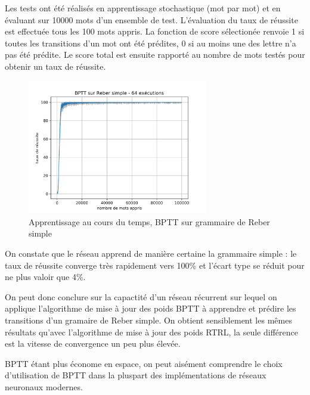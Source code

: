 \medskip

Les tests ont été réalisés en apprentissage stochastique (mot par mot) et en
évaluant sur 10000 mots d'un ensemble de test. L'évaluation du taux de réussite
est effectuée tous les 100 mots appris. La fonction de score sélectionée renvoie
1 si toutes les transitions d'un mot ont été prédites, 0 si au moins une des
lettre n'a pas été prédite. Le score total est ensuite rapporté au nombre de
mots testés pour obtenir un taux de réussite.


\begin{figure}[!ht]
\begin{center}
\includegraphics[width=0.7\textwidth]{images/results/bptt_simplereber_ls30_lr01.png}
\caption{Apprentissage au cours du temps, BPTT sur grammaire de Reber simple}
\end{center}
\end{figure}

\medskip

On constate que le réseau apprend de manière certaine la grammaire simple : 
le taux de réussite converge très rapidement vers 100\% et l'écart type
se réduit pour ne plus valoir que 4\%.

\medskip

On peut donc conclure sur la capactité d'un réseau récurrent sur lequel on
applique l'algorithme de mise à jour des poids BPTT à apprendre et prédire les
transitions d'un gramaire de Reber simple. On obtient sensiblement les mêmes
résultats qu'avec l'algorithme de mise à jour des poids RTRL, la seule
différence est la vitesse de convergence un peu plus élevée.

\medskip

BPTT étant plus économe en espace, on peut aisément comprendre le choix
d'utilisation de BPTT dans la pluspart des implémentations de réseaux neuronaux
modernes.

